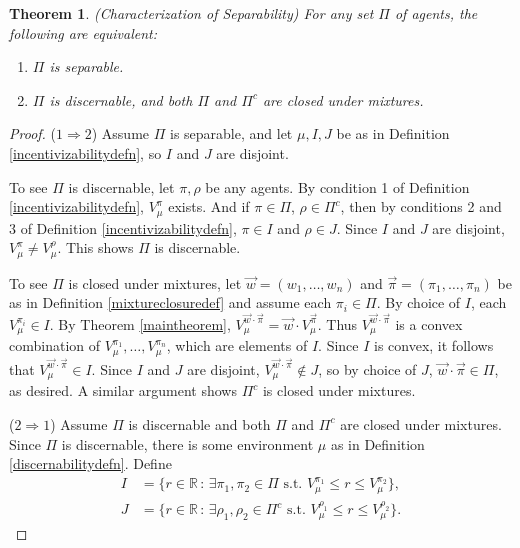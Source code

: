 \documentclass[twoside]{article}
\newtheorem{theorem}{Theorem}
\begin{document}
\begin{theorem}
    (Characterization of Separability)
    For any set $\Pi$ of agents, the following are equivalent:
    \begin{enumerate}
        \item $\Pi$ is separable.
        \item $\Pi$ is discernable, and both $\Pi$ and $\Pi^c$ are closed under mixtures.
    \end{enumerate}
\end{theorem}

\begin{proof}
    ($1\Rightarrow 2$)
    Assume $\Pi$ is separable, and let $\mu,I,J$ be as in
    Definition \ref{incentivizabilitydefn}, so $I$ and $J$ are disjoint.

    To see $\Pi$ is discernable, let $\pi,\rho$ be any agents.
    By condition 1 of Definition \ref{incentivizabilitydefn},
    $V^\pi_\mu$ exists. And if $\pi\in\Pi$, $\rho\in\Pi^c$, then
    by conditions 2 and 3 of Definition \ref{incentivizabilitydefn},
    $\pi\in I$ and $\rho\in J$. Since $I$ and $J$ are disjoint,
    $V^\pi_\mu\not=V^\rho_\mu$. This shows $\Pi$ is discernable.

    To see $\Pi$ is closed under mixtures, let $\vec w=(w_1,\ldots,w_n)$
    and $\vec\pi=(\pi_1,\ldots,\pi_n)$ be as in Definition \ref{mixtureclosuredef}
    and assume each $\pi_i\in\Pi$.
    By choice of $I$, each $V^{\pi_i}_\mu\in I$.
    By Theorem \ref{maintheorem},
    $V^{\vec w\cdot\vec\pi}_\mu=\vec w\cdot V^{\vec\pi}_\mu$.
    Thus $V^{\vec w\cdot\vec\pi}_\mu$ is a convex combination
    of $V^{\pi_1}_\mu,\ldots,V^{\pi_n}_\mu$, which are elements of $I$.
    Since $I$ is convex, it follows that $V^{\vec w\cdot\vec\pi}_\mu\in I$.
    Since $I$ and $J$ are disjoint, $V^{\vec w\cdot\vec\pi}_\mu\not\in J$,
    so by choice of $J$, $\vec w\cdot\vec\pi\in\Pi$, as desired.
    A similar argument shows $\Pi^c$ is closed under mixtures.

    ($2\Rightarrow 1$)
    Assume $\Pi$ is discernable and both $\Pi$ and $\Pi^c$ are closed under mixtures.
    Since $\Pi$ is discernable, there is some environment $\mu$
    as in Definition \ref{discernabilitydefn}.
    Define
    \begin{align*}
        I &= \{
            r\in\mathbb R
            \,:\,
            \exists \pi_1,\pi_2\in\Pi\mbox{ s.t. }V^{\pi_1}_\mu\leq r\leq V^{\pi_2}_\mu
        \},\\
        J &= \{
            r\in\mathbb R
            \,:\,
            \exists \rho_1,\rho_2\in\Pi^c\mbox{ s.t. }V^{\rho_1}_\mu\leq r\leq V^{\rho_2}_\mu
        \}.
    \end{align*}


\end{proof}
\end{document}
